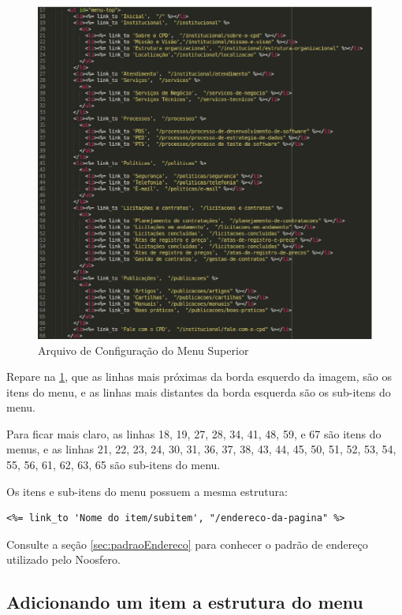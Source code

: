 \begin{figure}[h]
     \centering
       \includegraphics[scale=0.5]{figuras/menu-top}
     \caption{Arquivo de Configuração do Menu Superior}
     \label{fig:configMenuSuperior}
\end{figure}

Repare na \ref{fig:configMenuSuperior}, que as linhas mais próximas da borda esquerdo da imagem, são os itens do menu, e as linhas mais distantes da borda esquerda são os sub-itens do menu.

Para ficar mais claro, as linhas 18, 19, 27, 28, 34, 41, 48, 59, e 67 são itens do menus, e as linhas 21, 22, 23, 24, 30, 31, 36, 37, 38, 43, 44, 45, 50, 51, 52, 53, 54, 55, 56, 61, 62, 63, 65 são sub-itens do menu.

Os itens e sub-itens do menu possuem a mesma estrutura:

\begin{verbatim}
<%= link_to 'Nome do item/subitem', "/endereco-da-pagina" %>
\end{verbatim}

Consulte a seção \ref{sec:padraoEndereco} para conhecer o padrão de endereço utilizado pelo Noosfero.

\newpage
\subsection{Adicionando um item a estrutura do menu}

